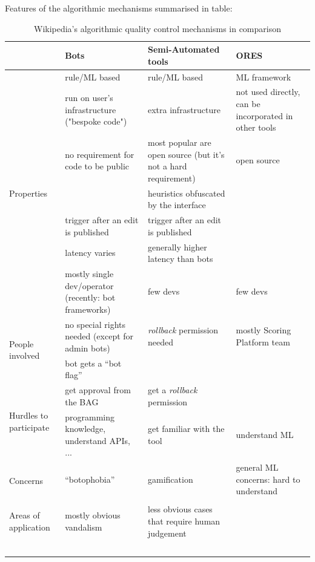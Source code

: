 Features of the algorithmic mechanisms summarised in table:
\begin{landscape}
    \begin{longtable}{ | p{4cm} | p{5cm} | p{5cm} | p{5cm} | }
    \hline
               & Bots & Semi-Automated tools & ORES \\
    \hline
    \multirow{7}{*}{Properties} & rule/ML based & rule/ML based & ML framework \\
                               & run on user's infrastructure ("bespoke code") & extra infrastructure & not used directly, can be incorporated in other tools \\
                               & no requirement for code to be public & most popular are open source (but it's not a hard requirement) & open source \\
                               & & heuristics obfuscated by the interface & \\
                               & trigger after an edit is published & trigger after an edit is published & \\
                               & latency varies & generally higher latency than bots & \\
                               & mostly single dev/operator (recently: bot frameworks) & few devs & few devs \\
    \hline
    \multirow{2}{*}{People involved} & no special rights needed (except for admin bots) & \emph{rollback} permission needed & mostly Scoring Platform team \\
                                     & bot gets a ``bot flag'' & & \\
    \hline
        \multirow{2}{*}{Hurdles to participate} & get approval from the BAG & get a \emph{rollback} permission& \\
                                            & programming knowledge, understand APIs, ... & get familiar with the tool & understand ML \\
    \hline
        \multirow{2}{*}{Concerns} & ``botophobia'' & gamification & general ML concerns: hard to understand \\
                                  & & & \\
    \hline
        Areas of application & mostly obvious vandalism & less obvious cases that require human judgement & \\
    \hline
    \caption{Wikipedia's algorithmic quality control mechanisms in comparison}~\label{table:mechanisms-comparison-literature}
\end{longtable}
\end{landscape}
